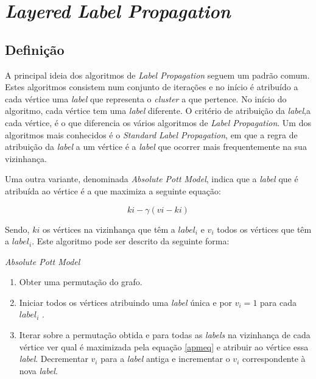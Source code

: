 \section{\textit{Layered Label Propagation}}

  \subsection{Definição}
  A principal ideia dos algoritmos de \textit{Label Propagation} seguem um padrão comum. Estes algoritmos consistem num conjunto de iterações e no início é atribuído a cada vértice uma \textit{label} que representa o \textit{cluster} a que pertence. No início do algoritmo, cada vértice tem uma \textit{label} diferente. O critério de atribuição da \textit{label},a cada vértice, é o que diferencia os vários algoritmos de \textit{Label Propagation}. Um dos algoritmos mais conhecidos é o \textit{Standard Label Propagation}, em que a regra de atribuição da \textit{label} a um vértice é a \textit{label} que ocorrer mais frequentemente na sua vizinhança. 
  
  Uma outra variante, denominada \textit{Absolute Pott Model}, indica que a \textit{label} que é atribuída ao vértice é a que maximiza a seguinte equação: 
 
  \begin{center}
    \begin{equation}
      \label{apmeq}
      ki-\gamma(vi-ki)
    \end{equation}
  \end{center}    
  
  Sendo, $ki$ os vértices na vizinhança que têm a $label_i$ e $v_i$ todos os vértices que têm a $label_i$.
  Este algoritmo pode ser descrito da seguinte forma:
  
  \begin{algorithm}[H]
    \caption{\textit{Absolute Pott Model}}\label{apmalg}
    \begin{enumerate}
    \item Obter uma permutação do grafo.
    \item Iniciar todos os vértices atribuindo uma \textit{label} única e por $v_i=1$ para cada $label_i$ .
    \item Iterar sobre a permutação obtida e para todas as \textit{labels} na vizinhança de cada vértice ver qual é maximizada pela equação \ref{apmeq} e atribuir ao vértice essa \textit{label}. Decrementar $v_i$ para a \textit{label} antiga e incrementar o $v_i$ correspondente à nova \textit{label}.
    \end{enumerate}
  \end{algorithm}

